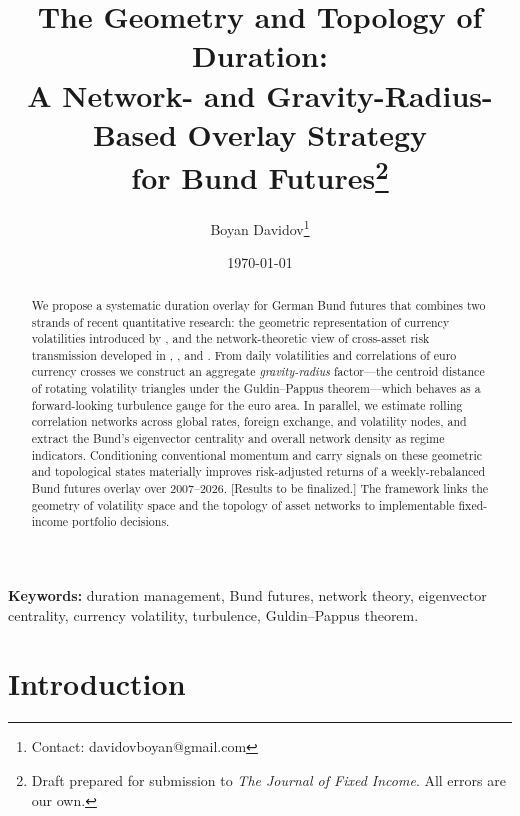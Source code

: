 \documentclass[12pt]{article}
\title{The Geometry and Topology of Duration:\\
A Network- and Gravity-Radius-Based Overlay Strategy\\
for Bund Futures\thanks{Draft prepared for submission to \emph{The Journal of Fixed Income}. All errors are our own.}}
\author{Boyan Davidov\thanks{Contact: davidovboyan@gmail.com}}
\date{\today}
\begin{document}
\maketitle

\begin{abstract}
\noindent We propose a systematic duration overlay for German Bund futures that combines two strands of recent quantitative research: the geometric representation of currency volatilities introduced by \citet{konstantinov2022geometry}, and the network-theoretic view of cross-asset risk transmission developed in \citet{konstantinov2023networks}, \citet{konstantinov2025networkmodels}, and \citet{konstantinov2025unsupervised}. From daily volatilities and correlations of euro currency crosses we construct an aggregate \emph{gravity-radius} factor---the centroid distance of rotating volatility triangles under the Guldin--Pappus theorem---which behaves as a forward-looking turbulence gauge for the euro area. In parallel, we estimate rolling correlation networks across global rates, foreign exchange, and volatility nodes, and extract the Bund's eigenvector centrality and overall network density as regime indicators. Conditioning conventional momentum and carry signals on these geometric and topological states materially improves risk-adjusted returns of a weekly-rebalanced Bund futures overlay over 2007--2026. [Results to be finalized.] The framework links the geometry of volatility space and the topology of asset networks to implementable fixed-income portfolio decisions.
\end{abstract}

\vspace{0.5em}
\noindent\textbf{Keywords:} duration management, Bund futures, network theory, eigenvector centrality, currency volatility, turbulence, Guldin--Pappus theorem.

\section{Introduction}\label{sec:intro}
\end{document}
